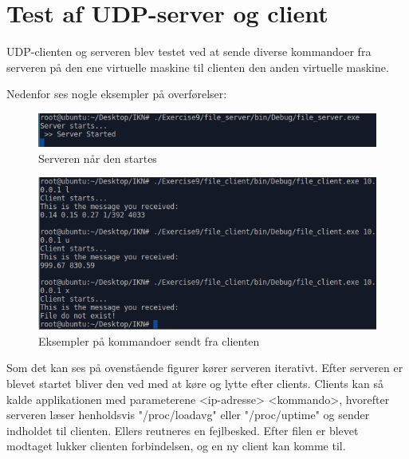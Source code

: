 \chapter{Test af UDP-server og client}\label{ch:test}
UDP-clienten og serveren blev testet ved at sende diverse kommandoer fra serveren på den ene virtuelle maskine til clienten den anden virtuelle maskine.

\noindent Nedenfor ses nogle eksempler på overførelser:

		\begin{figure}[H]
			\centering
			\includegraphics[width=160mm]{figures/Serverstartup.png}
			\caption{Serveren når den startes}
		\end{figure}

		\begin{figure}[H]
			\centering
			\includegraphics[width=160mm]{figures/clientrequests.png}
			\caption{Eksempler på kommandoer sendt fra clienten}
		\end{figure}

\noindent Som det kan ses på ovenstående figurer kører serveren iterativt. Efter serveren er blevet startet bliver den ved med at køre og lytte efter clients. Clients kan så kalde applikationen med parameterene <ip-adresse> <kommando>, hvorefter serveren læser henholdsvis "/proc/loadavg" eller "/proc/uptime" og sender indholdet til clienten. Ellers reutneres en fejlbesked. Efter filen er blevet modtaget lukker clienten forbindelsen, og en ny client kan komme til.
